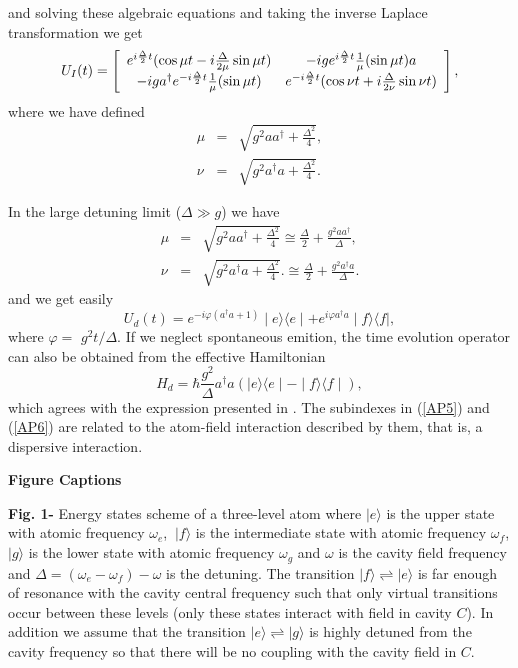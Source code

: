 \documentclass[12pt,thmsa]{article}
\begin{document}
and solving these algebraic equations and taking the inverse Laplace
transformation we get%
\begin{equation}
U_{I}(t)=\left[ 
\begin{array}{cc}
e^{i\frac{\Delta }{2}t}(\cos \mu t-i\frac{\Delta }{2\mu }\sin \mu t) & 
-ige^{i\frac{\Delta }{2}t}\frac{1}{\mu }(\sin \mu t)a \\ 
-iga^{\dag }e^{-i\frac{\Delta }{2}t}\frac{1}{\mu }(\sin \mu t) & e^{-i\frac{%
\Delta }{2}t}(\cos \nu t+i\frac{\Delta }{2\nu }\sin \nu t)%
\end{array}%
\right] ,  \label{UJC}
\end{equation}%
where we have defined%
\begin{eqnarray}
\mu &=&\sqrt{g^{2}aa^{\dag }+\frac{\Delta ^{2}}{4}},  \nonumber \\
\nu &=&\sqrt{g^{2}a^{\dag }a+\frac{\Delta ^{2}}{4}}.  \label{AP4}
\end{eqnarray}

In the large detuning limit ($\Delta \gg g$) we have%
\begin{eqnarray}
\mu &=&\sqrt{g^{2}aa^{\dag }+\frac{\Delta ^{2}}{4}}\cong \frac{\Delta }{2}+%
\frac{g^{2}aa^{\dag }}{\Delta },  \nonumber \\
\nu &=&\sqrt{g^{2}a^{\dag }a+\frac{\Delta ^{2}}{4}}.\cong \frac{\Delta }{2}+%
\frac{g^{2}a^{\dag }a}{\Delta }.
\end{eqnarray}%
and we get easily 
\begin{equation}
U_{d}(t)=e^{-i\varphi (a^{\dagger }a+1)}\mid e\rangle \langle e\mid
+e^{i\varphi a^{\dagger }a}\mid f\rangle \langle f\mid ,  \label{AP5}
\end{equation}%
where $\varphi =$ $g^{2}t/\Delta .$ If we neglect spontaneous emition, the
time evolution operator can also be obtained from the effective Hamiltonian%
\begin{equation}
H_{d}=\hbar \frac{g^{2}}{\Delta }a^{\dagger }a(\mid e\rangle \langle e\mid
-\mid f\rangle \langle f\mid ),  \label{AP6}
\end{equation}%
which agrees with the expression presented in \cite{Gerry, Holland, Milburn,
WallsMilburn, Orszag}. The subindexes in (\ref{AP5}) and (\ref{AP6}) are
related to the atom-field interaction described by them, that is, a
dispersive interaction.\bigskip

\noindent \textbf{Figure Captions} \bigskip

\textbf{Fig. 1-} Energy states scheme of a three-level atom where $|e\rangle 
$ is the upper state with atomic frequency $\omega _{e}$, $\ |f\rangle $ is
the intermediate state with atomic frequency $\omega _{f}$, $|g\rangle $ is
the lower state with atomic frequency $\omega _{g}$ and $\omega $ is the
cavity field frequency and $\Delta =(\omega _{e}-\omega _{f})-\omega $ is
the detuning. The transition $\mid f\rangle \rightleftharpoons \mid e\rangle 
$ is far enough of resonance with the cavity central frequency such that
only virtual transitions occur between these levels (only these states
interact with field in cavity $C$). In addition we assume that the
transition $\mid e\rangle \rightleftharpoons \mid g\rangle $ is highly
detuned from the cavity frequency so that there will be no coupling with the
cavity field in $C$.\bigskip
\end{document}
